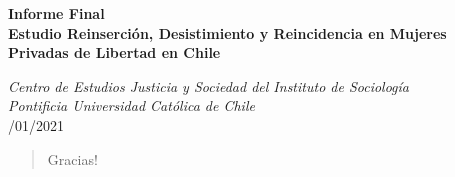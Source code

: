 \documentclass[11pt]{report}
\begin{document}

\thispagestyle{empty}

\renewcommand{\baselinestretch}{1}

\vspace*{60pt}

\begin{center}
\LARGE \textbf{Informe Final}\\
\vspace*{6pt}
\LARGE \textbf{Estudio Reinserción, Desistimiento y Reincidencia en Mujeres Privadas de Libertad en Chile} \\
\vspace*{24pt}


\end{center}

\begin{center}
\normalsize

\vspace*{12pt}
\textit{Centro de Estudios Justicia y Sociedad del Instituto de Sociología}\\
\textit{Pontificia Universidad Católica de Chile}\\


\vspace{60pt}
/01/2021\\
\end{center}

\setcounter{page}{1}

\renewcommand{\abstractname}{Agradecimientos}
\begin{abstract}

\setlength\parskip{11pt}
Gracias!
\end{abstract}

\newpage
\tableofcontents
\newpage
\listoftables
\newpage
\listoffigures

\newpage


\clearpage
{}
\setcounter{page}{1}

\end{document}
